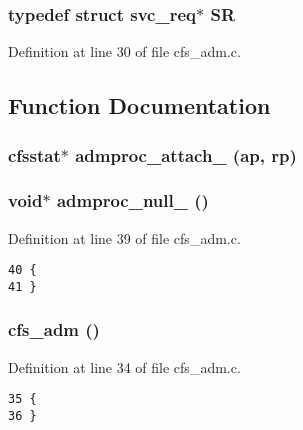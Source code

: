 \subsubsection{\setlength{\rightskip}{0pt plus 5cm}typedef struct svc\_\-req$\ast$ {\bf SR}}\label{cfs__adm_8c_a0}




Definition at line 30 of file cfs\_\-adm.c.

\subsection{Function Documentation}
\subsubsection{\setlength{\rightskip}{0pt plus 5cm}cfsstat$\ast$ admproc\_\-attach\_ (ap, {\bf rp})}\label{cfs__adm_8c_a6}


\subsubsection{\setlength{\rightskip}{0pt plus 5cm}void$\ast$ admproc\_\-null\_ ()}\label{cfs__adm_8c_a5}




Definition at line 39 of file cfs\_\-adm.c.



\footnotesize\begin{verbatim}40 {
41 }
\end{verbatim}\normalsize 
{}
\subsubsection{\setlength{\rightskip}{0pt plus 5cm}cfs\_\-adm ()}\label{cfs__adm_8c_a4}




Definition at line 34 of file cfs\_\-adm.c.



\footnotesize\begin{verbatim}35 {
36 }
\end{verbatim}\normalsize 


